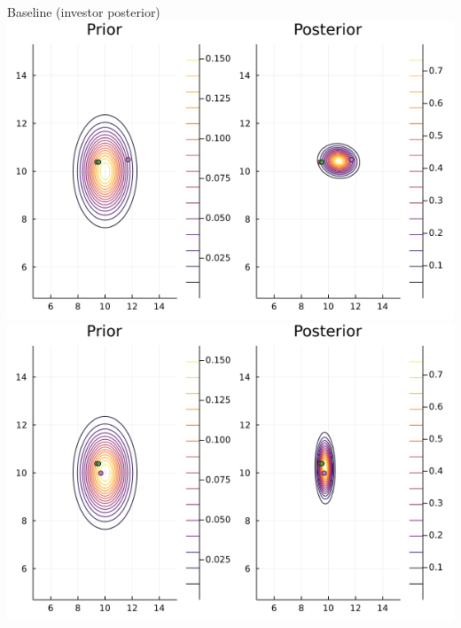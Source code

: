 \documentclass[
  ignorenonframetext,
]{beamer}
\begin{document}
\begin{frame}{Baseline (investor posterior)}
\protect\hypertarget{baseline-investor-posterior}{}
\includegraphics[width=0.4\paperwidth]{complexity_files/figure-beamer/unnamed-chunk-11-1}
\includegraphics[width=0.4\paperwidth]{complexity_files/figure-beamer/unnamed-chunk-11-2}
\end{frame}
\end{document}
